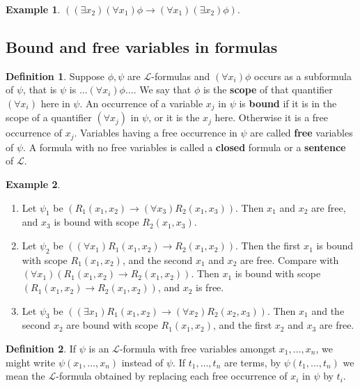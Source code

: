 \documentclass{article}
\newcommand{\rb}[1]{\left( #1 \right)}
\newcommand{\impb}[2]{\rb{#1 \rightarrow #2}}
\newcommand{\fab}[1]{\rb{\forall #1}}
\newcommand{\teb}[1]{\rb{\exists #1}}
\theoremstyle{definition}\newtheorem{definition}{Definition}[subsection]
\theoremstyle{definition}\newtheorem{remark}[definition]{Remark}
\theoremstyle{definition}\newtheorem*{example}{Example}
\theoremstyle{definition}\newtheorem*{note}{Note}
\begin{document}
\begin{example}
$ \impb{\teb{x_2}\fab{x_1}\phi}{\fab{x_1}\teb{x_2}\phi} $.
\end{example}

\subsection{Bound and free variables in formulas}

\begin{definition}
Suppose $ \phi, \psi $ are $ \mathcal{L} $-formulas and $ \fab{x_i}\phi $ occurs as a subformula of $ \psi $, that is $ \psi $ is $ \dots \fab{x_i}\phi \dots $. We say that $ \phi $ is the \textbf{scope} of that quantifier $ \fab{x_i} $ here in $ \psi $. An occurrence of a variable $ x_j $ in $ \psi $ is \textbf{bound} if it is in the scope of a quantifier $ \fab{x_j} $ in $ \psi $, or it is the $ x_j $ here. Otherwise it is a free occurrence of $ x_j $. Variables having a free occurrence in $ \psi $ are called \textbf{free} variables of $ \psi $. A formula with no free variables is called a \textbf{closed} formula or a \textbf{sentence} of $ \mathcal{L} $.
\end{definition}

\begin{example}
\hfill
\begin{enumerate}
\item Let $ \psi_1 $ be $ \impb{R_1\rb{x_1, x_2}}{\fab{x_3}R_2\rb{x_1, x_3}} $. Then $ x_1 $ and $ x_2 $ are free, and $ x_3 $ is bound with scope $ R_2\rb{x_1, x_3} $.
\item Let $ \psi_2 $ be $ \impb{\fab{x_1}R_1\rb{x_1, x_2}}{R_2\rb{x_1, x_2}} $. Then the first $ x_1 $ is bound with scope $ R_1\rb{x_1, x_2} $, and the second $ x_1 $ and $ x_2 $ are free. Compare with $ \fab{x_1}\impb{R_1\rb{x_1, x_2}}{R_2\rb{x_1, x_2}} $. Then $ x_1 $ is bound with scope $ \impb{R_1\rb{x_1, x_2}}{R_2\rb{x_1, x_2}} $, and $ x_2 $ is free.
\item Let $ \psi_3 $ be $ \impb{\teb{x_1}R_1\rb{x_1, x_2}}{\fab{x_2}R_2\rb{x_2, x_3}} $. Then $ x_1 $ and the second $ x_2 $ are bound with scope $ R_1\rb{x_1, x_2} $, and the first $ x_2 $ and $ x_3 $ are free.
\end{enumerate}
\end{example}

\begin{definition}
If $ \psi $ is an $ \mathcal{L} $-formula with free variables amongst $ x_1, \dots, x_n $, we might write $ \psi\rb{x_1, \dots, x_n} $ instead of $ \psi $. If $ t_1, \dots, t_n $ are terms, by $ \psi\rb{t_1, \dots, t_n} $ we mean the $ \mathcal{L} $-formula obtained by replacing each free occurrence of $ x_i $ in $ \psi $ by $ t_i $.
\end{definition}
\end{document}

